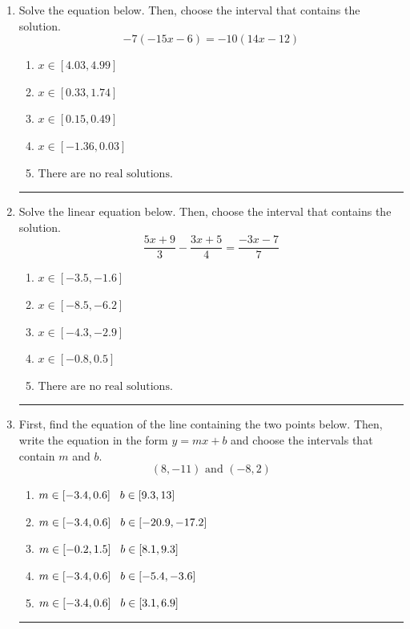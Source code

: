 \documentclass[14pt]{extbook}
\newcommand{\litem}[1]{\item#1\hspace*{-1cm}\rule{\textwidth}{0.4pt}}
\begin{document}
\begin{enumerate}
{\begin{enumerate}[label=\Alph*.]
\end{enumerate} }
\litem{
Solve the equation below. Then, choose the interval that contains the solution.\[ -7(-15x -6) = -10(14x -12) \]\begin{enumerate}[label=\Alph*.]
\item \( x \in [4.03, 4.99] \)
\item \( x \in [0.33, 1.74] \)
\item \( x \in [0.15, 0.49] \)
\item \( x \in [-1.36, 0.03] \)
\item \( \text{There are no real solutions.} \)

\end{enumerate} }
\litem{
Solve the linear equation below. Then, choose the interval that contains the solution.\[ \frac{5x + 9}{3} - \frac{3x + 5}{4} = \frac{-3x -7}{7} \]\begin{enumerate}[label=\Alph*.]
\item \( x \in [-3.5, -1.6] \)
\item \( x \in [-8.5, -6.2] \)
\item \( x \in [-4.3, -2.9] \)
\item \( x \in [-0.8, 0.5] \)
\item \( \text{There are no real solutions.} \)

\end{enumerate} }
\litem{
First, find the equation of the line containing the two points below. Then, write the equation in the form $ y=mx+b $ and choose the intervals that contain $m$ and $b$.\[ (8, -11) \text{ and } (-8, 2) \]\begin{enumerate}[label=\Alph*.]
\item \( m \in [-3.4, 0.6] \hspace*{3mm} b \in [9.3, 13] \)
\item \( m \in [-3.4, 0.6] \hspace*{3mm} b \in [-20.9, -17.2] \)
\item \( m \in [-0.2, 1.5] \hspace*{3mm} b \in [8.1, 9.3] \)
\item \( m \in [-3.4, 0.6] \hspace*{3mm} b \in [-5.4, -3.6] \)
\item \( m \in [-3.4, 0.6] \hspace*{3mm} b \in [3.1, 6.9] \)


\end{enumerate}}
\end{enumerate}
\end{document}
